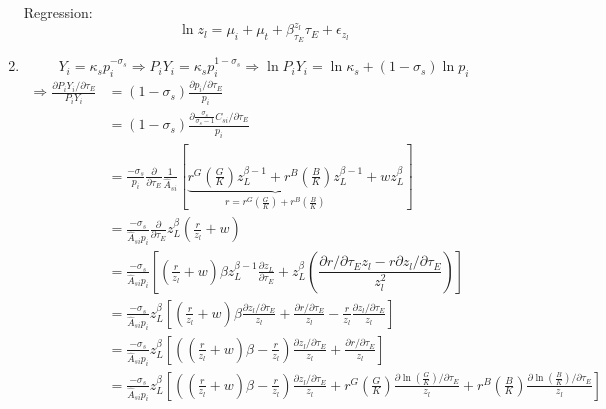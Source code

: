 \documentclass[12pt]{article} %
\begin{document}
\begin{enumerate}
    Regression:
    \begin{equation*}
        \ln z_l = \mu_i + \mu_t + \beta_{\tau_E}^{z_l} \tau_E + \epsilon_{z_l}
    \end{equation*}
    \item 
    \begin{equation*}
        Y_i = \kappa_s p_i^{-\sigma_s} \Rightarrow P_iY_i = \kappa_s p_i^{1-\sigma_s} \Rightarrow \ln P_iY_i = \ln \kappa_s + (1-\sigma_s) \ln p_i
    \end{equation*}
    \begin{equation*}
        \begin{split}
            \Rightarrow  \frac{\partial P_iY_i/\partial\tau_E}{P_iY_i} & = (1-\sigma_s) \frac{\partial p_i/\partial\tau_E}{p_i} \\
             &  = (1-\sigma_s) \frac{\partial \frac{\sigma_s}{\sigma_s - 1} C_{si}/\partial\tau_E}{p_i}\\
                & =  \frac{- \sigma_s}{p_i} \frac{\partial }{\partial\tau_E} \frac{1}{\hat{A}_{si}} \left[
                    \underbrace{r^G (\frac{G}{K}) z_L^{\beta-1} 
                    + r^B (\frac{B}{K}) z_L^{\beta-1}}_{r = r^G (\frac{G}{K}) + r^B (\frac{B}{K})}
                    + w z_L^{\beta}
                   \right]\\
                & = \frac{- \sigma_s}{\hat{A}_{si}p_i} \frac{\partial }{\partial\tau_E} z_L^{\beta}(
                    \frac{r}{z_l} + w
                )\\
                & = \frac{- \sigma_s}{\hat{A}_{si}p_i} \left[
                    (\frac{r}{z_l} + w)\beta z_L^{\beta-1} \frac{\partial z_L}{\partial \tau_E} + z_L^{\beta}(
                        \dfrac{\partial r / \partial \tau_E z_l - r\partial z_l / \partial \tau_E}{z_l^2}
                    )
                \right]\\
                & = \frac{- \sigma_s}{\hat{A}_{si}p_i} z_L^{\beta} \left[
                    (\frac{r}{z_l} + w)\beta\frac{ \partial z_l / \partial \tau_E}{z_l} 
                    + \frac{\partial r / \partial \tau_E}{z_l} 
                    -\frac{r}{z_l} \frac{ \partial z_l / \partial \tau_E}{z_l}
                \right]\\
                & = \frac{- \sigma_s}{\hat{A}_{si}p_i} z_L^{\beta} \left[
                    ((\frac{r}{z_l} + w)\beta-\frac{r}{z_l} )\frac{ \partial z_l / \partial \tau_E}{z_l} 
                    + \frac{\partial r / \partial \tau_E}{z_l}
                \right]  \\
                & =  \frac{- \sigma_s}{\hat{A}_{si}p_i} z_L^{\beta} \left[
                    ((\frac{r}{z_l} + w)\beta-\frac{r}{z_l} )\frac{ \partial z_l / \partial \tau_E}{z_l} 
                    + r^G (\frac{G}{K})\frac{ \partial \ln (\frac{G}{K}) / \partial \tau_E}{z_l}
                    + r^B (\frac{B}{K})\frac{ \partial \ln (\frac{B}{K}) / \partial \tau_E}{z_l}
                \right]
        \end{split}
    \end{equation*}
    

\end{enumerate}
\end{document}
